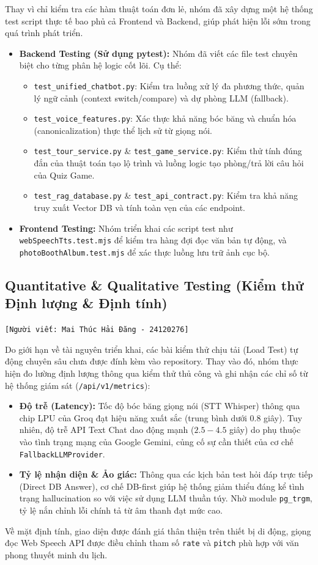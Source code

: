 Thay vì chỉ kiểm tra các hàm thuật toán đơn lẻ, nhóm đã xây dựng một hệ thống test script thực tế bao phủ cả Frontend và Backend, giúp phát hiện lỗi sớm trong quá trình phát triển.
\begin{itemize}
    \item \textbf{Backend Testing (Sử dụng pytest):} Nhóm đã viết các file test chuyên biệt cho từng phân hệ logic cốt lõi. Cụ thể:
    \begin{itemize}
        \item \texttt{test\_unified\_chatbot.py}: Kiểm tra luồng xử lý đa phương thức, quản lý ngữ cảnh (context switch/compare) và dự phòng LLM (fallback).
        \item \texttt{test\_voice\_features.py}: Xác thực khả năng bóc băng và chuẩn hóa (canonicalization) thực thể lịch sử từ giọng nói.
        \item \texttt{test\_tour\_service.py} \& \texttt{test\_game\_service.py}: Kiểm thử tính đúng đắn của thuật toán tạo lộ trình và luồng logic tạo phòng/trả lời câu hỏi của Quiz Game.
        \item \texttt{test\_rag\_database.py} \& \texttt{test\_api\_contract.py}: Kiểm tra khả năng truy xuất Vector DB và tính toàn vẹn của các endpoint.
    \end{itemize}
    \item \textbf{Frontend Testing:} Nhóm triển khai các script test như \texttt{webSpeechTts.test.mjs} để kiểm tra hàng đợi đọc văn bản tự động, và \texttt{photoBoothAlbum.test.mjs} để xác thực luồng lưu trữ ảnh cục bộ.
\end{itemize}

\subsection{Quantitative \& Qualitative Testing (Kiểm thử Định lượng \& Định tính)}
\texttt{[Người viết: Mai Thúc Hải Đăng - 24120276]}


Do giới hạn về tài nguyên triển khai, các bài kiểm thử chịu tải (Load Test) tự động chuyên sâu chưa được đính kèm vào repository. Thay vào đó, nhóm thực hiện đo lường định lượng thông qua kiểm thử thủ công và ghi nhận các chỉ số từ hệ thống giám sát (\texttt{/api/v1/metrics}):
\begin{itemize}
    \item \textbf{Độ trễ (Latency):} Tốc độ bóc băng giọng nói (STT Whisper) thông qua chip LPU của Groq đạt hiệu năng xuất sắc (trung bình dưới 0.8 giây). Tuy nhiên, độ trễ API Text Chat dao động mạnh ($2.5 - 4.5$ giây) do phụ thuộc vào tình trạng mạng của Google Gemini, củng cố sự cần thiết của cơ chế \texttt{FallbackLLMProvider}.
    \item \textbf{Tỷ lệ nhận diện \& Ảo giác:} Thông qua các kịch bản test hỏi đáp trực tiếp (Direct DB Answer), cơ chế DB-first giúp hệ thống giảm thiểu đáng kể tình trạng hallucination so với việc sử dụng LLM thuần túy. Nhờ module \texttt{pg\_trgm}, tỷ lệ nắn chỉnh lỗi chính tả từ âm thanh đạt mức cao.
\end{itemize}
Về mặt định tính, giao diện được đánh giá thân thiện trên thiết bị di động, giọng đọc Web Speech API được điều chỉnh tham số \texttt{rate} và \texttt{pitch} phù hợp với văn phong thuyết minh du lịch.

